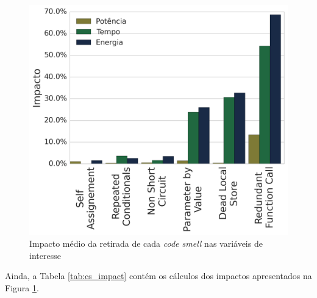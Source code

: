 \begin{figure}[htp]
\centering
\includegraphics[scale=0.70]{figuras/Exper/CodeSmells/codesmells_impact.png}
\caption{Impacto médio da retirada de cada \emph{code smell} nas variáveis de interesse}
\label{fig:cs_barplot_all}
\end{figure}\FloatBarrier

Ainda, a Tabela \ref{tab:cs_impact} contém os cálculos dos impactos apresentados na Figura \ref{fig:cs_barplot_all}.

